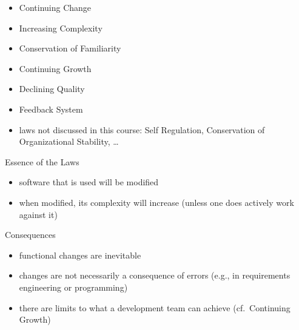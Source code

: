 \begin{frame}{\insertsubsection{} \mytitlesource{\lehmanslaws, \sommerville}}
	\begin{fancycolumns}
		\begin{definition}{\insertsubsection}
			\begin{itemize}
				\item Continuing Change
				\item Increasing Complexity
				\item Conservation of Familiarity
				\item Continuing Growth
				\item Declining Quality
				\item Feedback System
				\item laws not discussed in this course: Self Regulation, Conservation of Organizational Stability, \ldots
			\end{itemize}
		\end{definition}
		\nextcolumn
		\begin{note}{Essence of the Laws}
			\begin{itemize}
				\item software that is used will be modified
				\item when modified, its complexity will increase (unless one does actively work against it)
			\end{itemize}
		\end{note}
		\begin{example}{Consequences}
			\begin{itemize}
				\item functional changes are inevitable
				\item changes are not necessarily a consequence of errors (e.g., in requirements engineering or programming)
				\item there are limits to what a development team can achieve (cf.\ Continuing Growth)
			\end{itemize}
		\end{example}
	\end{fancycolumns}
\end{frame}

















